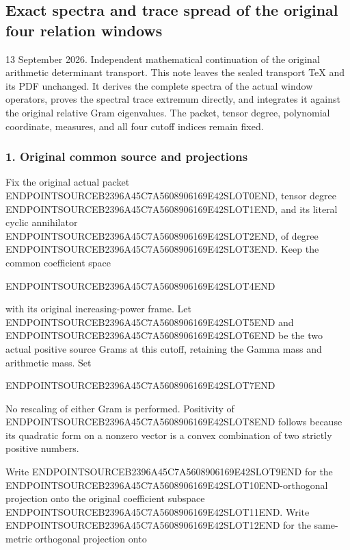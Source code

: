 \subsection{Exact spectra and trace spread of the original four relation windows}\label{endpoint-window_review--exact-spectra-and-trace-spread-of-the-original-four-relation-windows}

13 September 2026. Independent mathematical continuation of the original arithmetic determinant transport. This note leaves the sealed transport TeX and its PDF unchanged. It derives the complete spectra of the actual window operators, proves the spectral trace extremum directly, and integrates it against the original relative Gram eigenvalues. The packet, tensor degree, polynomial coordinate, measures, and all four cutoff indices remain fixed.

\subsubsection{1. Original common source and projections}\label{endpoint-window_review--original-common-source-and-projections}

Fix the original actual packet ENDPOINTSOURCEB2396A45C7A5608906169E42SLOT0END, tensor degree ENDPOINTSOURCEB2396A45C7A5608906169E42SLOT1END, and its literal cyclic annihilator ENDPOINTSOURCEB2396A45C7A5608906169E42SLOT2END, of degree ENDPOINTSOURCEB2396A45C7A5608906169E42SLOT3END. Keep the common coefficient space

ENDPOINTSOURCEB2396A45C7A5608906169E42SLOT4END

with its original increasing-power frame. Let ENDPOINTSOURCEB2396A45C7A5608906169E42SLOT5END and ENDPOINTSOURCEB2396A45C7A5608906169E42SLOT6END be the two actual positive source Grams at this cutoff, retaining the Gamma mass and arithmetic mass. Set

ENDPOINTSOURCEB2396A45C7A5608906169E42SLOT7END

No rescaling of either Gram is performed. Positivity of ENDPOINTSOURCEB2396A45C7A5608906169E42SLOT8END follows because its quadratic form on a nonzero vector is a convex combination of two strictly positive numbers.

Write ENDPOINTSOURCEB2396A45C7A5608906169E42SLOT9END for the ENDPOINTSOURCEB2396A45C7A5608906169E42SLOT10END-orthogonal projection onto the original coefficient subspace ENDPOINTSOURCEB2396A45C7A5608906169E42SLOT11END. Write ENDPOINTSOURCEB2396A45C7A5608906169E42SLOT12END for the same-metric orthogonal projection onto

